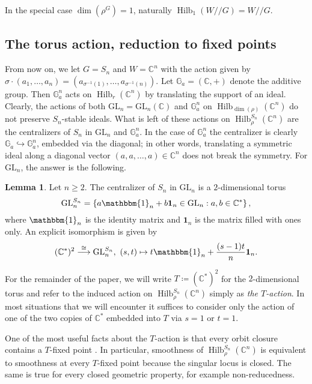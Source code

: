 \documentclass[11pt]{amsart}
\theoremstyle{definition}
\newtheorem{lemma}[theorem]{Lemma}
\newcommand{\CC}{\mathbb{C}}
\DeclareMathOperator{\Hilb}{Hilb}
\begin{document}
In the special case $\dim(\rho^G) = 1$, naturally $\Hilb_{1}(W//G) = W//G$.


\subsection{The torus action, reduction to fixed points}
From now on, we let $G = S_n$ and $W = \CC^n$ with the action given by $\sigma \cdot (a_1,\ldots,a_n) = (a_{\sigma^{-1}(1)},\ldots,a_{\sigma^{-1}(n)})$. Let $\mathbb{G}_a = (\CC,+)$ denote the additive group. Then $\mathbb{G}_a^n$ acts on $\Hilb_r(\CC^n)$ by translating the support of an ideal. Clearly, the actions of both $\mathrm{GL}_n = \mathrm{GL}_n(\CC)$ and $\mathbb{G}_a^n$ on $\Hilb_{\dim(\rho)}(\CC^n)$ do not preserve $S_n$-stable ideals. What is left of these actions on $\Hilb^{S_n}_\rho(\CC^n)$ are the centralizers of $S_n$ in $\mathrm{GL}_n$ and $\mathbb{G}_a^n$.
In the case of $\mathbb{G}_a^n$ the centralizer is clearly $\mathbb{G}_a \hookrightarrow \mathbb{G}_a^n$, embedded via the diagonal; in other words, translating a symmetric ideal along a diagonal vector $(a,a,\ldots,a) \in \CC^n$ does not break the symmetry.
For $\mathrm{GL}_n$, the answer is the following.
\begin{lemma}
    Let $n \geq 2$. The centralizer of $S_n$ in $\mathrm{GL}_n$ is a $2$-dimensional torus
    \begin{equation*}
        \mathrm{GL}_n^{S_n} = \left\{ a\mathbbm{1}_n + b\mathbf{1}_n \in \mathrm{GL}_n : a,b \in \CC^* \right\},
    \end{equation*}
    where $\mathbbm{1}_n$ is the identity matrix and $\mathbf{1}_n$ is the matrix filled with ones only. An explicit isomorphism is given by
    \begin{equation*}
        (\CC^\ast)^2 \overset{\cong}{\longrightarrow} \mathrm{GL}_n^{S_n}, \ (s,t) \mapsto t \mathbbm{1}_n + \frac{(s-1)t}{n} \mathbf{1}_n.
    \end{equation*}
\end{lemma}
For the remainder of the paper, we will write $T \coloneqq (\CC^\ast)^2$ for the $2$-dimensional torus and refer to the induced action on $\Hilb^{S_n}_\rho(\CC^n)$ simply as \emph{the $T$-action}. In most situations that we will encounter it suffices to consider only the action of one of the two copies of $\CC^\ast$ embedded into $T$ via $s=1$ or $t=1$.

One of the most useful facts about the $T$-action is that every orbit closure contains a $T$-fixed point \cite[Remarks~3.13(iii)]{BrionInvariantHilb}. In particular, smoothness of $\Hilb^{S_n}_\rho(\CC^n)$ is equivalent to smoothness at every $T$-fixed point because the singular locus is closed. The same is true for every closed geometric property, for example non-reducedness.
\end{document}

